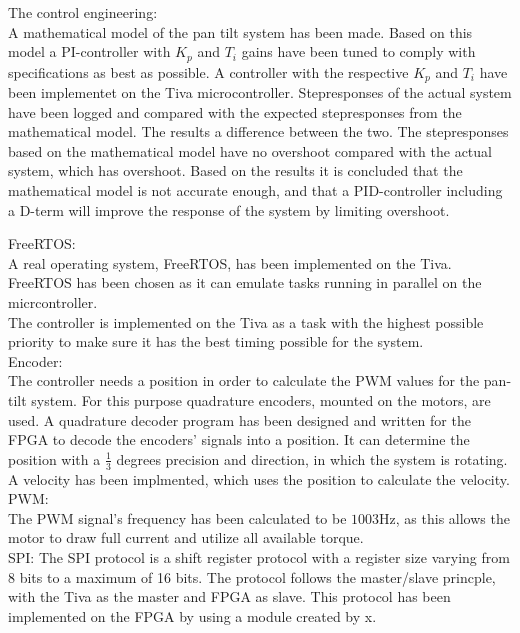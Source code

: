 \documentclass[../../main]{subfiles}
\begin{document}
The control engineering: \\
A mathematical model of the pan tilt system has been made. Based on this model a PI-controller with $K_p$ and $T_i$ gains have been tuned to comply with specifications as best as possible. 
A controller with the respective $K_p$ and $T_i$ have been implementet on the Tiva microcontroller. Stepresponses of the actual system have been logged and compared with the expected stepresponses from the mathematical model. The results a difference between the two. The stepresponses based on the mathematical model have no overshoot compared with the actual system, which has overshoot. Based on the results it is concluded that the mathematical model is not accurate enough, and that a PID-controller including a D-term will improve the response of the system by limiting overshoot.  

FreeRTOS:\\
A real operating system, FreeRTOS, has been implemented on the Tiva. FreeRTOS has been chosen as it can emulate tasks running in parallel on the micrcontroller. \\
The controller is implemented on the Tiva as a task with the highest possible priority to make sure it has the best timing possible for the system.
\\

Encoder:\\
The controller needs a position in order to calculate the PWM values for the pan-tilt system. For this purpose quadrature encoders, mounted on the motors, are used.
A quadrature decoder program has been designed and written for the FPGA to decode the encoders' signals into a position.
It can determine the position with a $\frac{1}{3}$ degrees precision and direction, in which the system is rotating. A velocity has been implmented, which uses the position to calculate the velocity.
\\

PWM:\\
The PWM signal's frequency has been calculated to be $1003$Hz, as this allows the motor to draw full current and utilize all available torque. \\

SPI:
The SPI protocol is a shift register protocol with a register size varying from 8 bits to a maximum of 16 bits. The protocol follows the master/slave princple, with the Tiva as the master and FPGA as slave. This protocol has been implemented on the FPGA by using a module created by x. 
\end{document}
